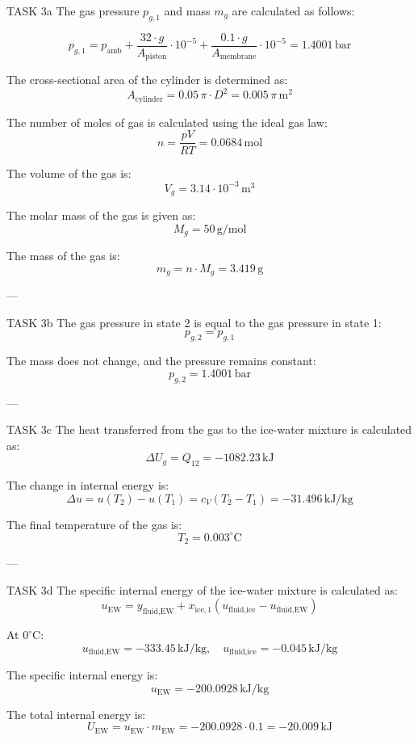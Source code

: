 TASK 3a  
The gas pressure \( p_{g,1} \) and mass \( m_g \) are calculated as follows:  

\[
p_{g,1} = p_{\text{amb}} + \frac{32 \cdot g}{A_{\text{piston}}} \cdot 10^{-5} + \frac{0.1 \cdot g}{A_{\text{membrane}}} \cdot 10^{-5} = 1.4001 \, \text{bar}
\]

The cross-sectional area of the cylinder is determined as:  
\[
A_{\text{cylinder}} = 0.05 \, \pi \cdot D^2 = 0.005 \, \pi \, \text{m}^2
\]

The number of moles of gas is calculated using the ideal gas law:  
\[
n = \frac{p V}{R T} = 0.0684 \, \text{mol}
\]

The volume of the gas is:  
\[
V_g = 3.14 \cdot 10^{-3} \, \text{m}^3
\]

The molar mass of the gas is given as:  
\[
M_g = 50 \, \text{g/mol}
\]

The mass of the gas is:  
\[
m_g = n \cdot M_g = 3.419 \, \text{g}
\]

---

TASK 3b  
The gas pressure in state 2 is equal to the gas pressure in state 1:  
\[
p_{g,2} = p_{g,1}
\]

The mass does not change, and the pressure remains constant:  
\[
p_{g,2} = 1.4001 \, \text{bar}
\]

---

TASK 3c  
The heat transferred from the gas to the ice-water mixture is calculated as:  
\[
\Delta U_{g} = Q_{12} = -1082.23 \, \text{kJ}
\]

The change in internal energy is:  
\[
\Delta u = u(T_2) - u(T_1) = c_V (T_2 - T_1) = -31.496 \, \text{kJ/kg}
\]

The final temperature of the gas is:  
\[
T_2 = 0.003^\circ \text{C}
\]

---

TASK 3d  
The specific internal energy of the ice-water mixture is calculated as:  
\[
u_{\text{EW}} = y_{\text{fluid,EW}} + x_{\text{ice},1} (u_{\text{fluid,ice}} - u_{\text{fluid,EW}})
\]

At \( 0^\circ \text{C} \):  
\[
u_{\text{fluid,EW}} = -333.45 \, \text{kJ/kg}, \quad u_{\text{fluid,ice}} = -0.045 \, \text{kJ/kg}
\]

The specific internal energy is:  
\[
u_{\text{EW}} = -200.0928 \, \text{kJ/kg}
\]

The total internal energy is:  
\[
U_{\text{EW}} = u_{\text{EW}} \cdot m_{\text{EW}} = -200.0928 \cdot 0.1 = -20.009 \, \text{kJ}
\]